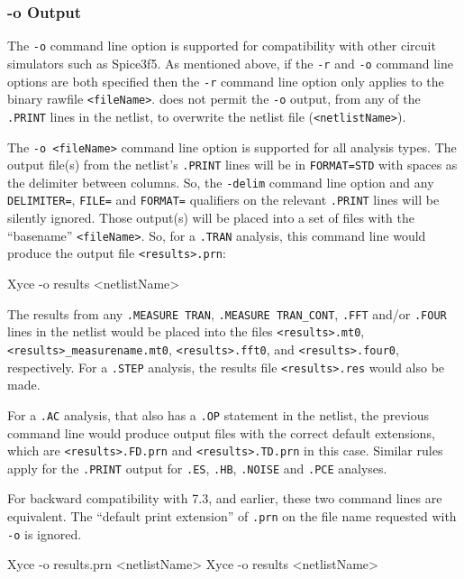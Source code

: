 \subsubsection{-o Output}
The \verb+-o+ command line option is supported for compatibility with other
circuit simulators such as Spice3f5.  As mentioned above, if the \verb+-r+ and 
\verb+-o+ command line options are both specified then the \verb+-r+ command
line option only applies to the binary rawfile \verb+<fileName>+.  \Xyce{}
does not permit the \verb+-o+ output, from any of the \texttt{.PRINT} lines
in the netlist, to overwrite the netlist file (\verb+<netlistName>+).  

The \verb+-o <fileName>+ command line option is supported for all analysis types.
The output file(s) from the netlist's \texttt{.PRINT} lines
will be in \texttt{FORMAT=STD} with spaces as the delimiter between columns.
So, the \verb+-delim+ command line option and any \texttt{DELIMITER=}, \texttt{FILE=}
and \texttt{FORMAT=} qualifiers on the relevant \texttt{.PRINT} lines will be
silently ignored.  Those output(s) will be placed into a set of files with the
``basename'' \verb+<fileName>+.  So, for a \texttt{.TRAN} analysis, this
command line would produce the output file \verb+<results>.prn+:
\begin{vquote}
   Xyce -o results <netlistName>
\end{vquote}

The results from any \texttt{.MEASURE TRAN}, \texttt{.MEASURE TRAN\_CONT},
\texttt{.FFT} and/or \texttt{.FOUR} lines in the netlist would be placed into
the files \verb+<results>.mt0+, \verb+<results>_measurename.mt0+,
\verb+<results>.fft0+, and \verb+<results>.four0+, respectively.  For a
\texttt{.STEP} analysis, the results file \verb+<results>.res+ would also be
made.

For a \texttt{.AC} analysis, that also has a \texttt{.OP} statement in the netlist,
the previous command line would produce output files with the correct default
extensions, which are \verb+<results>.FD.prn+ and \verb+<results>.TD.prn+ in this
case.  Similar rules apply for the \texttt{.PRINT} output for \texttt{.ES},
\texttt{.HB}, \texttt{.NOISE} and \texttt{.PCE} analyses.

For backward compatibility with \Xyce{} 7.3, and earlier, these two command lines
are equivalent.  The ``default print extension'' of  \verb+.prn+ on the file name
requested with \verb+-o+ is ignored.
\begin{vquote}
   Xyce -o results.prn <netlistName>
   Xyce -o results <netlistName>
\end{vquote}

